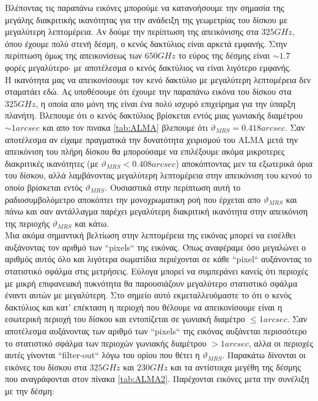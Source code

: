 Βλέποντας τις παραπάνω εικόνες μπορούμε να κατανοήσουμε την σημασία της μεγάλης  διακριτικής ικανότητας για την ανάδειξη της γεωμετρίας του δίσκου με μεγαλύτερη λεπτομέρεια. Αν δούμε την περίπτωση της απεικόνισης στα $325GHz$, όπου έχουμε πολύ στενή δέσμη, ο κενός δακτύλιος είναι αρκετά εμφανής. Στην περίπτωση όμως της απεικονίσεως των $650GHz$ το εύρος της δέσμης είναι $\sim1.7$ φορές μεγαλύτερο$\cdot$ με αποτέλεσμα ο κενός δακτύλιος να είναι λιγότερο εμφανής.\\

Η ικανότητα μας να απεικονίσουμε τον κενό δακτύλιο με μεγαλύτερη λεπτομέρεια δεν σταματάει εδώ. Ας υποθέσουμε ότι έχουμε την παραπάνω εικόνα του δίσκου στα $325GHz$, η οποία απο μόνη της είναι ένα πολύ ισχυρό επιχείρημα για την ύπαρξη πλανήτη. Βλεπουμε ότι ο κενός δακτύλιος βρίσκεται εντός μιας γωνιακής διαμέτρου  $\sim 1 arcsec$ και απο τον πινακα \ref{tab:ALMA} βλεπουμε ότι $\vartheta_{MRS} = 0.418 arcsec$. Σαν αποτέλεσμα αν είχαμε πραγματικά την δυνατότητα χειρισμού του {\en ALMA} μετά την απεικόνιση του πλήρη δίσκου θα μπορούσαμε να επιλέξουμε ακόμα μικροτερες διακριτικές ικανότητες (με $\vartheta_{MRS} < 0.408 arcsec$) αποκόπτοντας μεν τα εξωτερικά όρια του δίσκου, αλλά λαμβάνοντας μεγαλύτερη λεπτομέρεια στην απεικόνιση του κενού το οποίο βρίσκεται εντός $\vartheta_{MRS}$. Ουσιαστικά στην περίπτωση αυτή το ραδιοσυμβολόμετρο αποκόπτει την μονοχρωματικη ροή που έρχεται απο $\vartheta_{MRS}$ και πάνω και σαν αντάλλαγμα παρέχει μεγαλύτερη διακριτική ικανότητα στην απεικόνιση της περιοχής $\vartheta_{MRS}$ και κάτω.\\

Μια ακόμα σημαντική βελτίωση στην λεπτομέρεια της εικόνας μπορεί να εισέλθει αυξάνοντας τον αριθμό των {\en ``pixels``} της εικόνας. Όπως αναφέραμε όσο μεγαλώνει ο αριθμός αυτός όλο και λιγότερα σωματίδια περιέχονται σε κάθε {\en ``pixel``} αυξάνοντας το στατιστικό σφάλμα στις μετρήσεις. Εύλογα μπορεί να συμπεράνει κανείς ότι περιοχές με μικρή επιφανειακή πυκνότητα θα παρουσιάζουν μεγαλύτερο στατιστικό σφάλμα έναντι αυτών με μεγαλύτερη. Στο σημείο αυτό εκμεταλλευόμαστε το ότι ο κενός δακτύλιος και κατ' επέκταση η περιοχή που θέλουμε να απεικονίσουμε είναι η εσωτερική περιοχή του δίσκου και εντοπίζεται σε γωνιακή διαμέτρο $\leq 1 arcsec$. Σαν αποτέλεσμα αυξάνοντας των αριθμό των {\en ``pixels``} της εικόνας αυξάνεται περισσότερο το στατιστικό σφάλμα των περιοχών γωνιακής διαμέτρου $> 1 arcsec$, αλλα οι περιοχές αυτές γίνονται {\en ``filter-out``} λόγω του ορίου που θέτει η $\vartheta_{MRS}$. Παρακάτω δίνονται οι εικόνες του δίσκου στα $325GHz$ και $230GHz$ και τα αντίστοιχα μεγέθη της δέσμης που αναγράφονται στον πίνακα \ref{tab:ALMA2}. Παρέχονται εικόνες μετα την συνέλιξη με την δέσμη:

